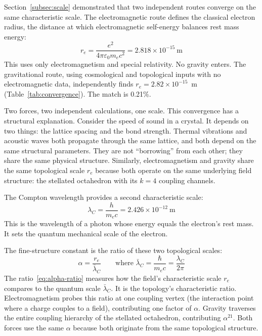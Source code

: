 \documentclass[aps,prd,preprint,superscriptaddress,showpacs,preprintnumbers,amsmath,amssymb,nofootinbib]{revtex4-2}
\begin{document}
Section~\ref{subsec:scale} demonstrated that two independent routes converge on the same characteristic scale. The electromagnetic route defines the classical electron radius, the distance at which electromagnetic self-energy balances rest mass energy:
\begin{equation}
r_e = \frac{e^2}{4\pi\varepsilon_0 m_e c^2} = 2.818 \times 10^{-15}~\text{m}
\end{equation}
This uses only electromagnetism and special relativity. No gravity enters. The gravitational route, using cosmological and topological inputs with no electromagnetic data, independently finds $r_e = 2.82 \times 10^{-15}$~m (Table~\ref{tab:convergence}). The match is 0.21\%.

Two forces, two independent calculations, one scale. This convergence has a structural explanation. Consider the speed of sound in a crystal. It depends on two things: the lattice spacing and the bond strength. Thermal vibrations and acoustic waves both propagate through the same lattice, and both depend on the same structural parameters. They are not ``borrowing'' from each other; they share the same physical structure. Similarly, electromagnetism and gravity share the same topological scale $r_e$ because both operate on the same underlying field structure: the stellated octahedron with its $k = 4$ coupling channels.

The Compton wavelength provides a second characteristic scale:
\begin{equation}
\lambda_C = \frac{h}{m_e c} = 2.426 \times 10^{-12}~\text{m}
\end{equation}
This is the wavelength of a photon whose energy equals the electron's rest mass. It sets the quantum mechanical scale of the electron.

The fine-structure constant is the ratio of these two topological scales:
\begin{equation}
\alpha = \frac{r_e}{\bar{\lambda}_C} \qquad \text{where } \bar{\lambda}_C = \frac{\hbar}{m_e c} = \frac{\lambda_C}{2\pi}
\label{eq:alpha-ratio}
\end{equation}
The ratio~\eqref{eq:alpha-ratio} measures how the field's characteristic scale $r_e$ compares to the quantum scale $\bar{\lambda}_C$. It is the topology's characteristic ratio. Electromagnetism probes this ratio at one coupling vertex (the interaction point where a charge couples to a field), contributing one factor of $\alpha$. Gravity traverses the entire coupling hierarchy of the stellated octahedron, contributing $\alpha^{21}$. Both forces use the same $\alpha$ because both originate from the same topological structure.
\end{document}
